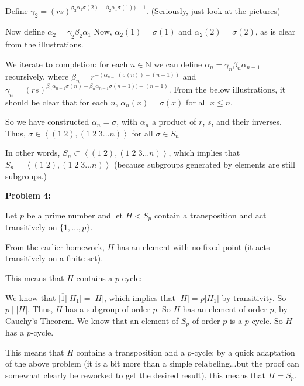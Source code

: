 \documentclass[a4paper,12pt]{article}
\newcommand{\tab}{\hspace{4mm}} %
\newcommand{\shunt}{\vspace{20mm}}
\newcommand{\absval}[1]{\lvert #1 \rvert}
\newcommand{\anbrack}[1]{\left\langle #1 \right\rangle}
\newcommand{\al}{\alpha} %
\newcommand{\be}{\beta}
\newcommand{\ga}{\gamma}
\newcommand{\N}{\mathbb{N}}
\begin{document}
\shunt %

\shunt

\tab Define $\ga_2 = (rs)^{\be_2\al_1\sigma(2)-\be_2\al_1\sigma(1)) -1}$. (Seriously, just look at the pictures)

\shunt %

\shunt

\tab Now define $\al_2 = \ga_2\be_2\al_1$ Now, $\al_2(1) = \sigma(1)$ and $\al_2(2) = \sigma(2)$, as is clear from the illustrations.

\tab We iterate to completion: for each $n \in \N$ we can define $\al_n = \ga_n\be_n\al_{n-1}$ recursively, where $\be_n = r^{-(\al_{n-1}(\sigma(n))-(n-1))}$ and $\ga_n = (rs)^{\be_n\al_{n-1}\sigma(n)-\be_n\al_{n-1}\sigma(n-1)) -(n-1)}$. From the below illustrations, it should be clear that for each $n$, $\al_n(x) = \sigma(x)$ for all $x \leq n$.

\shunt %

\shunt

\tab So we have constructed $\al_n = \sigma$, with $\al_n$ a product of $r$, $s$, and their inverses. Thus, $\sigma \in \anbrack{(1 \; 2) , (1 \; 2 \; 3 \ldots n)}$ for all $\sigma \in S_n$

In other words, $S_n \subset \anbrack{(1 \; 2) , (1 \; 2 \; 3 \ldots n)}$, which implies that $S_n = \anbrack{(1 \; 2) , (1 \; 2 \; 3 \ldots n)}$ (because subgroups generated by elements are still subgroups.)

\shunt

{\bf Problem 4:}

Let $p$ be a prime number and let $H<S_p$ contain a transposition and act transitively on $\{1,\ldots,p\}$.

From the earlier homework, $H$ has an element with no fixed point (it acts transitively on a finite set).

This means that $H$ contains a $p$-cycle:

\tab We know that $\absval{\overline{1}}\absval{H_1} = \absval{H}$, which implies that $\absval{H} = p \absval{H_{1}}$ by transitivity. So $p \mid \absval{H}$. Thus, $H$ has a subgroup of order $p$. So $H$ has an element of order $p$, by Cauchy's Theorem. We know that an element of $S_p$ of order $p$ is a $p$-cycle. So $H$ has a $p$-cycle.

This means that $H$ contains a transposition and a $p$-cycle; by a quick adaptation of the above problem (it is a bit more than a simple relabeling...but the proof can somewhat clearly be reworked to get the desired result), this means that $H = S_p$.
\end{document}
